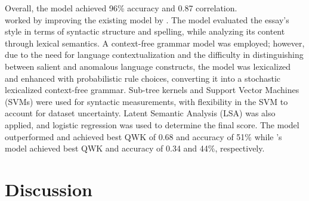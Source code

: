 \documentclass{article}
\begin{document}
	Overall, the model achieved 96\% accuracy and 0.87 correlation. \\
	\textbf{\textcite{26_alsanie2022threelevels}} worked by improving the existing model by \textcite{6_ghamdi2014hybridarabic}. The model evaluated the essay’s style in terms of syntactic structure and spelling, while analyzing its content through lexical semantics. A context-free grammar model was employed; however, due to the need for language contextualization and the difficulty in distinguishing between salient and anomalous language constructs, the model was lexicalized and enhanced with probabilistic rule choices, converting it into a stochastic lexicalized context-free grammar. Sub-tree kernels and Support Vector Machines (SVMs) were used for syntactic measurements, with flexibility in the SVM to account for dataset uncertainty. Latent Semantic Analysis (LSA) was also applied, and logistic regression was used to determine the final score. The model outperformed \textcite{6_ghamdi2014hybridarabic} and achieved best QWK of 0.68 and accuracy of 51\% while \textcite{6_ghamdi2014hybridarabic}'s model achieved best QWK and accuracy of 0.34 and 44\%, respectively.
	
	
	\section{Discussion}
	
	\begin{center}
	\end{center}
	
\end{document}
